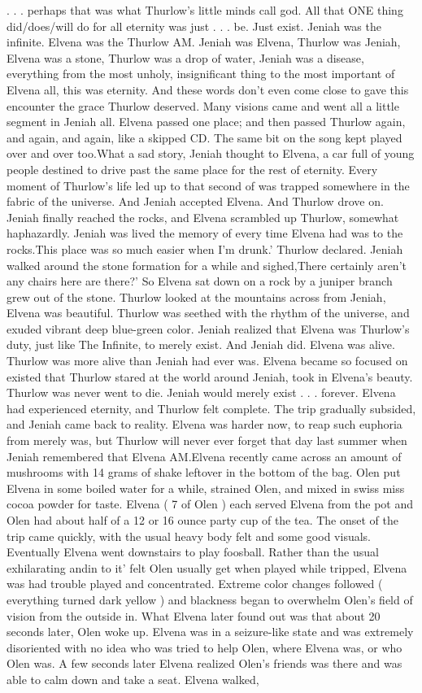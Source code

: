 \documentclass[12pt]{book}
\begin{document}
. . .  perhaps that was what Thurlow's little minds call god. All that ONE thing did/does/will do for all eternity was just . . .  be. Just exist. Jeniah was the infinite. Elvena was the Thurlow AM. Jeniah was Elvena, Thurlow was Jeniah, Elvena was a stone, Thurlow was a drop of water, Jeniah was a disease, everything from the most unholy, insignificant thing to the most important of Elvena all, this was eternity. And these words don't even come close to gave this encounter the grace Thurlow deserved. Many visions came and went all a little segment in Jeniah all. Elvena passed one place; and then passed Thurlow again, and again, and again, like a skipped CD. The same bit on the song kept played over and over too.What a sad story, Jeniah thought to Elvena, a car full of young people destined to drive past the same place for the rest of eternity. Every moment of Thurlow's life led up to that second of was trapped somewhere in the fabric of the universe. And Jeniah accepted Elvena. And Thurlow drove on. Jeniah finally reached the rocks, and Elvena scrambled up Thurlow, somewhat haphazardly. Jeniah was lived the memory of every time Elvena had was to the rocks.This place was so much easier when I'm drunk.' Thurlow declared. Jeniah walked around the stone formation for a while and sighed,There certainly aren't any chairs here are there?' So Elvena sat down on a rock by a juniper branch grew out of the stone. Thurlow looked at the mountains across from Jeniah, Elvena was beautiful. Thurlow was seethed with the rhythm of the universe, and exuded vibrant deep blue-green color. Jeniah realized that Elvena was Thurlow's duty, just like The Infinite, to merely exist. And Jeniah did. Elvena was alive. Thurlow was more alive than Jeniah had ever was. Elvena became so focused on existed that Thurlow stared at the world around Jeniah, took in Elvena's beauty. Thurlow was never went to die. Jeniah would merely exist . . .  forever. Elvena had experienced eternity, and Thurlow felt complete. The trip gradually subsided, and Jeniah came back to reality. Elvena was harder now, to reap such euphoria from merely was, but Thurlow will never ever forget that day last summer when Jeniah remembered that Elvena AM.Elvena recently came across an amount of mushrooms with 14 grams of shake leftover in the bottom of the bag. Olen put Elvena in some boiled water for a while, strained Olen, and mixed in swiss miss cocoa powder for taste. Elvena ( 7 of Olen ) each served Elvena from the pot and Olen had about half of a 12 or 16 ounce party cup of the tea. The onset of the trip came quickly, with the usual heavy body felt and some good visuals. Eventually Elvena went downstairs to play foosball. Rather than the usual exhilarating andin to it' felt Olen usually get when played while tripped, Elvena was had trouble played and concentrated. Extreme color changes followed ( everything turned dark yellow ) and blackness began to overwhelm Olen's field of vision from the outside in. What Elvena later found out was that about 20 seconds later, Olen woke up. Elvena was in a seizure-like state and was extremely disoriented with no idea who was tried to help Olen, where Elvena was, or who Olen was. A few seconds later Elvena realized Olen's friends was there and was able to calm down and take a seat. Elvena walked, 
\end{document}
